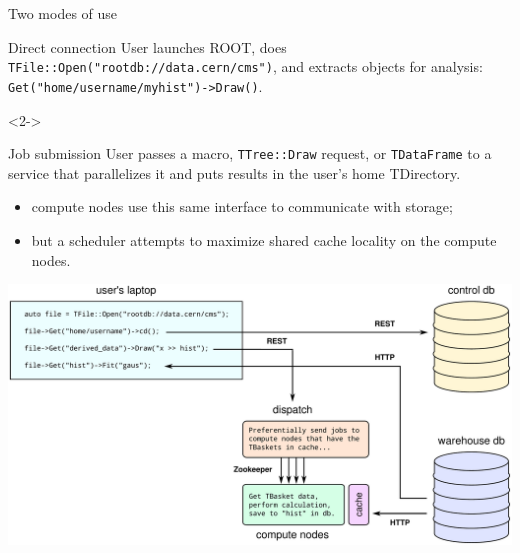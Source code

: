 \documentclass[aspectratio=169]{beamer}
\begin{document}
\begin{frame}{Two modes of use}
\vspace{0.5 cm}
\begin{block}{Direct connection}
User launches ROOT, does {\tt TFile::Open("rootdb://data.cern/cms")}, and extracts objects for analysis: {\tt Get("home/username/myhist")->Draw()}.
\end{block}

\vspace{0.5 cm}
\begin{uncoverenv}<2->
\begin{block}{Job submission}
User passes a macro, {\tt TTree::Draw} request, or {\tt TDataFrame} to a service that parallelizes it and puts results in the user's home TDirectory.

\begin{itemize}
\item<3-> compute nodes use this same interface to communicate with storage;
\item<4-> but a scheduler attempts to maximize shared cache locality on the compute nodes.
\end{itemize}
\end{block}
\end{uncoverenv}

\vspace{0.25 cm}
\begin{center}
\large {}
\end{center}
\end{frame}

\begin{frame}{}
\vspace{1.25 cm}
\includegraphics[width=\linewidth]{root-query-system.pdf}
\end{frame}
\end{document}
